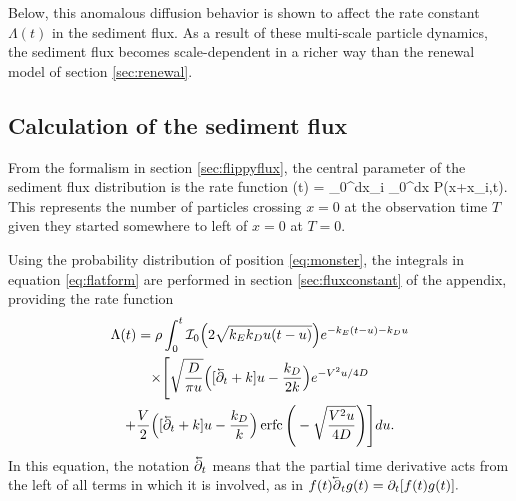 Below, this anomalous diffusion behavior \citep[c.f.][]{Sokolov2012} is shown to affect the rate constant $\Lambda(t)$ in the sediment flux. As a result of these multi-scale particle dynamics, the sediment flux becomes scale-dependent in a richer way than the renewal model of section \ref{sec:renewal}.

\subsection{Calculation of the sediment flux}

From the formalism in section \ref{sec:flippyflux}, the central parameter of the sediment flux distribution is the rate function
\be \Lambda(t) = \rho \int_0^\infty dx_i \int_0^\infty dx P(x+x_i,t). \label{eq:flatform}\ee
This represents the number of particles crossing $x=0$ at the observation time $T$ given they started somewhere to left of $x=0$ at $T=0$.

Using the probability distribution of position \ref{eq:monster}, the integrals in equation \ref{eq:flatform} are performed in section \ref{sec:fluxconstant} of the appendix, providing the rate function
\begin{multline} 
\Lambda(t) = \rho \int_0^t \mathcal{I}_0\Big(2\sqrt{k_Ek_Du(t-u)}\Big)e^{-k_E(t-u)-k_D u} \\
\times \Bigg[\sqrt{\frac{D}{\pi u}}\Big([\cev{\partial_t} + k]u-\frac{k_D}{2 k}\Big)e^{-V^2 u/4D} \\+ \frac{V}{2}\Big([\cev{\partial_t} + k]u -\frac{k_D}{k}\Big) \erfc\Bigg(-\sqrt{\frac{V^2 u}{4D}}\Bigg)\Bigg] du. \label{eq:fluxy}
\end{multline}
In this equation, the notation $\cev{\partial_t}$ means that the partial time derivative acts from the left of all terms in which it is involved, as in $f(t)\cev{\partial}_t g(t) = \partial_t [f(t)g(t)].$

